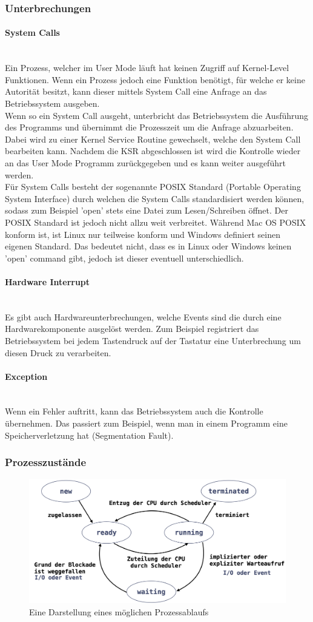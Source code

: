 \documentclass{article}
\newcommand{\paragraphlb}[1]{\paragraph{#1}\mbox{}\\}
\begin{document}
	\subsubsection{Unterbrechungen}
	\paragraphlb{System Calls}
	Ein Prozess, welcher im User Mode läuft hat keinen Zugriff auf Kernel-Level Funktionen. Wenn ein Prozess jedoch eine Funktion benötigt, für welche er keine Autorität besitzt, kann dieser mittels System Call eine Anfrage an das Betriebssystem ausgeben. \\
	Wenn so ein System Call ausgeht, unterbricht das Betriebssystem die Ausführung des Programms und übernimmt die Prozesszeit um die Anfrage abzuarbeiten. Dabei wird zu einer Kernel Service Routine gewechselt, welche den System Call bearbeiten kann. Nachdem die KSR abgeschlossen ist wird die Kontrolle wieder an das User Mode Programm zurückgegeben und es kann weiter ausgeführt werden. \\
	Für System Calls besteht der sogenannte POSIX Standard (Portable Operating System Interface) durch welchen die System Calls standardisiert werden können, sodass zum Beispiel 'open' stets eine Datei zum Lesen/Schreiben öffnet. Der POSIX Standard ist jedoch nicht allzu weit verbreitet. Während Mac OS POSIX konform ist, ist Linux nur teilweise konform und Windows definiert seinen eigenen Standard. Das bedeutet nicht, dass es in Linux oder Windows keinen 'open' command gibt, jedoch ist dieser eventuell unterschiedlich.
	\paragraphlb{Hardware Interrupt}
	Es gibt auch Hardwareunterbrechungen, welche Events sind die durch eine Hardwarekomponente ausgelöst werden. Zum Beispiel registriert das Betriebssystem bei jedem Tastendruck auf der Tastatur eine Unterbrechung um diesen Druck zu verarbeiten.
	\paragraphlb{Exception}
	Wenn ein Fehler auftritt, kann das Betriebssystem auch die Kontrolle übernehmen. Das passiert zum Beispiel, wenn man in einem Programm eine Speicherverletzung hat (Segmentation Fault).
	\subsubsection{Prozesszustände}
	\begin{figure}[H]
	\centering
	\includegraphics[scale=0.3]{Bilder/states.png}
	\caption{Eine Darstellung eines möglichen Prozessablaufs}
	\end{figure}
	
\end{document}
